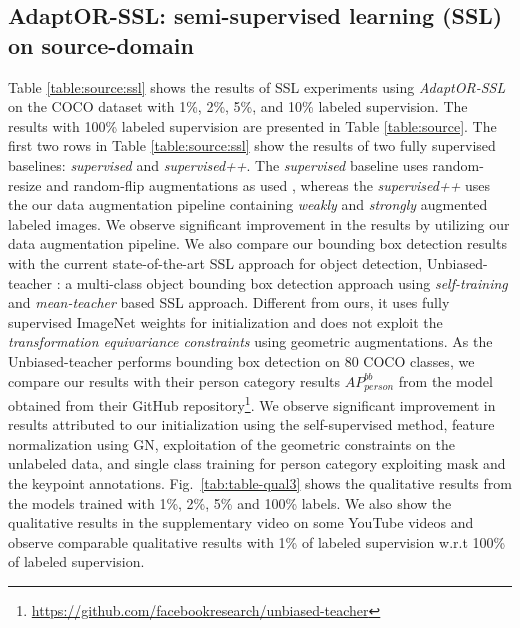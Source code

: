 \subsection{AdaptOR-SSL: semi-supervised learning (SSL) on source-domain}
Table \ref{table:source:ssl} shows the results of SSL experiments using \emph{AdaptOR-SSL} on the COCO dataset with 1\%, 2\%, 5\%, and 10\% labeled supervision. The results with 100\% labeled supervision are presented in Table \ref{table:source}. The first two rows in Table \ref{table:source:ssl} show the results of two fully supervised baselines: \emph{supervised} and \emph{supervised++}. The \emph{supervised} baseline uses random-resize and random-flip augmentations as used \citep{he2017mask}, whereas the \emph{supervised++} uses the our data augmentation pipeline containing \emph{weakly} and \emph{strongly} augmented labeled images. We observe significant improvement in the results by utilizing our data augmentation pipeline. We also compare our bounding box detection results with the current state-of-the-art SSL approach for object detection, Unbiased-teacher \citep{liu2021unbiased}: a multi-class object bounding box detection approach using \emph{self-training} and \emph{mean-teacher} based SSL approach. Different from ours, it uses fully supervised ImageNet weights for initialization and does not exploit the \emph{transformation equivariance constraints} using geometric augmentations. As the Unbiased-teacher performs bounding box detection on 80 COCO classes, we compare our results with their person category results \emph{$AP_{person}^{bb}$} from the model obtained from their GitHub repository\footnote{\url{https://github.com/facebookresearch/unbiased-teacher}}. We observe significant improvement in results attributed to our initialization using the self-supervised method, feature normalization using GN, exploitation of the geometric constraints on the unlabeled data, and single class training for person category exploiting mask and the keypoint annotations. Fig.~\ref{tab:table-qual3} shows the qualitative results from the models trained with 1\%, 2\%, 5\% and 100\% labels. We also show the qualitative results in the supplementary video on some YouTube videos and observe comparable qualitative results with 1\% of labeled supervision w.r.t 100\% of labeled supervision.


